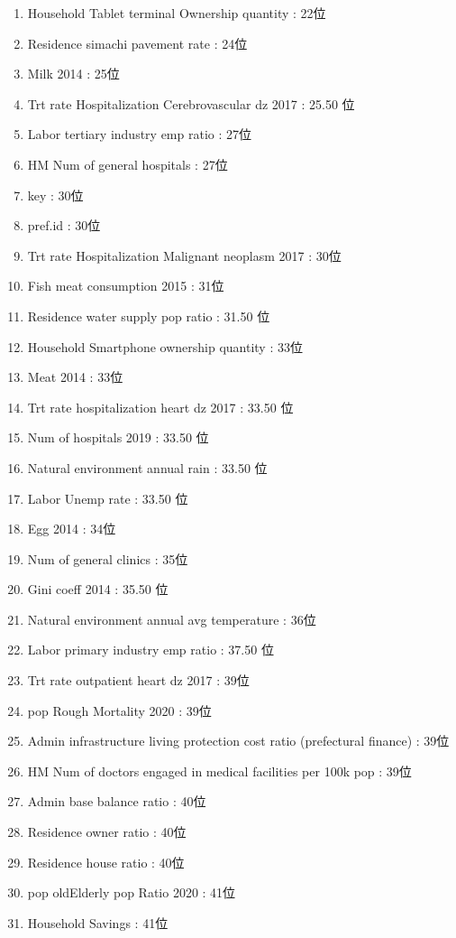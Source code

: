\begin{multicols}{2}
\begin{enumerate}
	\item Household Tablet terminal Ownership quantity : 22位
	\item Residence simachi pavement rate : 24位
	\item Milk 2014 : 25位
	\item Trt rate Hospitalization Cerebrovascular dz 2017 : 25.50 位
	\item Labor tertiary industry emp ratio : 27位
	\item HM Num of general hospitals : 27位
	\item key : 30位
	\item pref.id : 30位
	\item Trt rate Hospitalization Malignant neoplasm 2017 : 30位
	\item Fish meat consumption 2015 : 31位
	\item Residence water supply pop ratio : 31.50 位
	\item Household Smartphone ownership quantity : 33位
	\item Meat 2014 : 33位
	\item Trt rate hospitalization heart dz 2017 : 33.50 位
	\item Num of hospitals 2019 : 33.50 位
	\item Natural environment annual rain : 33.50 位
	\item Labor Unemp rate : 33.50 位
	\item Egg 2014 : 34位
	\item Num of general clinics : 35位
	\item Gini coeff 2014 : 35.50 位
	\item Natural environment annual avg temperature : 36位
	\item Labor primary industry emp ratio : 37.50 位
	\item Trt rate outpatient heart dz 2017 : 39位
	\item pop Rough Mortality 2020 : 39位
	\item Admin infrastructure living protection cost ratio (prefectural finance) : 39位
	\item HM Num of doctors engaged in medical facilities per 100k pop : 39位
	\item Admin base balance ratio : 40位
	\item Residence owner ratio : 40位
	\item Residence house ratio : 40位
	\item pop oldElderly pop Ratio 2020 : 41位
	\item Household Savings : 41位

\end{enumerate}
\end{multicols}
